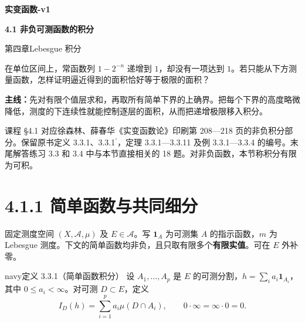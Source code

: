 \documentclass[11pt,a4paper]{article}
\begin{document}
\begin{center}{\LARGE\bfseries 实变函数-v1\par}\vspace{7pt}
{\Large\bfseries 4.1 非负可测函数的积分\par}\vspace{6pt}
{第四章\quad Lebesgue 积分\par}\end{center}
在单位区间上，常函数列 \(1-2^{-n}\) 递增到 \(1\)，却没有一项达到
\(1\)。若只能从下方测量函数，怎样证明逼近得到的面积恰好等于极限的面积？
\par\textbf{主线：}先对有限个值层求和，再取所有简单下界的上确界。把每个下界的高度略微降低，测度的下连续性就能控制逐层的面积，从而把递增极限移入积分。
\begin{center}
\end{center}
课程 §4.1 对应徐森林、薛春华《实变函数论》印刷第 208---218
页的非负积分部分。保留原书定义 3.3.1、3.3.1\ensuremath{{}^{\prime}}，定理 3.3.1---3.3.11 及例
3.3.1---3.3.4 的编号。末尾解答练习 3.3 和 3.4 中与本节直接相关的 18
题。对非负函数，本节称积分有限为可积。
\begingroup\small\setlength{\parskip}{0pt}\tableofcontents\endgroup
\newpage
\clearpage\section[\S{}4.1.1
简单函数与共同细分]{4.1.1
简单函数与共同细分}\label{ux7b80ux5355ux51fdux6570ux4e0eux5171ux540cux7ec6ux5206}

固定测度空间 \((X,\mathcal A,\mu)\) 及 \(E\in\mathcal A\)。写
\(\mathbf1_A\) 为可测集 \(A\) 的指示函数，\(m\) 为 Lebesgue
测度。下文的简单函数均非负，且只取有限多个\textbf{有限实值}。可在 \(E\)
外补零。

\begin{sboxenv}{navy}{定义 3.3.1（简单函数积分）}
设 \(A_1,\ldots,A_p\) 是 \(E\)
的可测分割，\(h=\sum_i a_i\mathbf1_{A_i}\)，其中
\(0\le a_i<\infty\)。对可测 \(D\subset E\)，定义 \begin{equation*}
I_D(h)=\sum_{i=1}^p a_i\mu(D\cap A_i),\qquad 0\cdot\infty=\infty\cdot0=0 .
\end{equation*}

\end{sboxenv}
\end{document}

